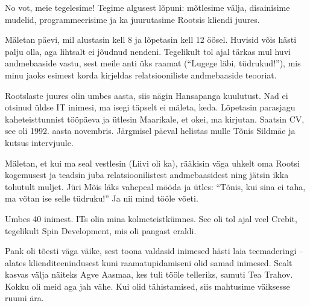 No vot, meie tegelesime! Tegime algusest lõpuni: mõtlesime välja, disainisime 
mudelid, programmeerisime ja ka juurutasime Rootsis kliendi juures. 


Mäletan päevi, mil alustasin 
kell 8 ja lõpetasin kell 12 öösel. Huvisid võis hästi palju 
olla, aga lihtsalt ei jõudnud nendeni. Tegelikult tol ajal tärkas mul huvi 
andmebaaside vastu, sest meile anti üks raamat (\enquote{Lugege läbi, tüdrukud!}), mis minu jaoks esimest korda kirjeldas relatsiooniliste andmebaaside 
teooriat. 

Rootslaste juures olin umbes aasta, siis nägin 
Hansapanga kuulutust. Nad ei otsinud üldse IT inimesi, ma isegi täpselt ei mäleta, keda. 
Lõpetasin parasjagu kaheteisttunnist tööpäeva ja ütlesin Maarikale, et okei, 
ma kirjutan. Saatsin CV, see oli 1992. aasta novembris. Järgmisel päeval 
helistas mulle Tõnis Sildmäe ja kutsus intervjuule. 

Mäletan, et kui ma seal vestlesin (Liivi oli 
ka), rääkisin väga uhkelt oma Rootsi kogemusest ja teadsin juba 
relatsioonilistest andmebaasidest ning jätsin ikka tohutult muljet. Jüri 
Mõis läks vahepeal mööda ja ütles: \enquote{Tõnis, kui sina 
ei taha, ma võtan ise selle tüdruku!} Ja nii mind tööle võeti. 


Umbes 40 inimest. ITs olin mina kolmeteistkümnes. See oli tol ajal veel
Crebit, tegelikult Spin Development, mis oli pangast eraldi. 


Pank oli tõesti väga väike, sest toona valdasid inimesed 
hästi laia teemaderingi -- alates klienditeenindusest kuni raamatupidamiseni 
olid samad inimesed. Sealt kasvas välja näiteks Agve 
Aasmaa, kes tuli tööle telleriks, samuti Tea 
Trahov. Kokku oli meid aga jah vähe. Kui 
olid tähistamised, siis mahtusime väiksesse ruumi ära. 

